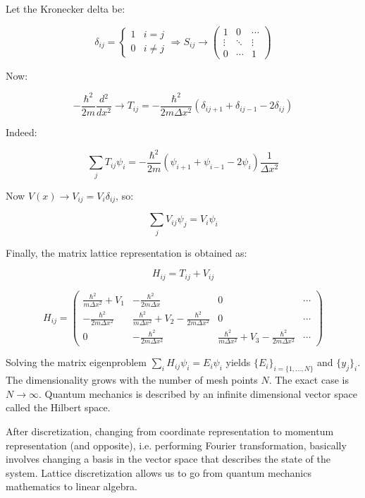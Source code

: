   Let the Kronecker delta be:

      $$\delta_{ij} =\begin{cases}1 &i=j\\0 &i\neq j\end{cases}\Rightarrow S_{ij} \rightarrow\begin{pmatrix}1 & 0 & \cdots\\\vdots & \ddots &\vdots \\0&\cdots & 1 \end{pmatrix}$$

  Now:

  $$-\frac{\hbar^2}{2m}\frac{d{^2}}{d{x^2}}\rightarrow T_{ij}=-\frac{\hbar^2}{2m\Delta x^2}(\delta_{ij+1}+\delta_{ij-1}-2\delta_{ij})$$

  Indeed:

  $$\sum\limits_{j}T_{ij}\psi_i = -\frac{\hbar^2}{2m}(\psi_{i+1}+\psi_{i-1}-2\psi_i)\frac{1}{\Delta x^2}$$

  Now $V(x) \rightarrow V_{ij} = V_i\delta_{ij}$, so:

  $$\sum\limits_{j}V_{ij}\psi_j = V_i\psi_i$$

  Finally, the matrix lattice representation is obtained as:

  $$H_{ij} = T_{ij} + V_{ij}$$

  $$H_{ij} = \begin{pmatrix}\frac{\hbar^2}{m\Delta x^2} + V_1 & -\frac{\hbar^2}{2m\Delta x} & 0 & \cdots\\ -\frac{\hbar^2}{2m\Delta x^2} & \frac{\hbar^2}{m\Delta x^2}+V_2-\frac{\hbar^2}{2m \Delta x^2} & 0 & \cdots\\ 0 & -\frac{\hbar^2}{2m\Delta x^2} & \frac{\hbar^2}{m\Delta x^2}+V_3 - \frac{\hbar^2}{2m\Delta x^2} & \cdots\end{pmatrix}$$

  Solving the matrix eigenproblem $\sum\limits_i H_{ij}\psi_i = E_i\psi_i$ yields $\{E_i\}_{i=\{1,\dots,N\}}$ and $\{y_j\}_i$. 
  The dimensionality grows with the number of mesh points $N$.
  The exact case is $N\rightarrow\infty$.
  Quantum mechanics is described by an infinite dimensional vector space called the Hilbert space.

  After discretization, changing from coordinate representation to momentum representation (and opposite), i.e. performing Fourier transformation, basically involves changing a basis in the vector space that describes the state of the system. Lattice discretization allows us to go from quantum mechanics mathematics to linear algebra.


